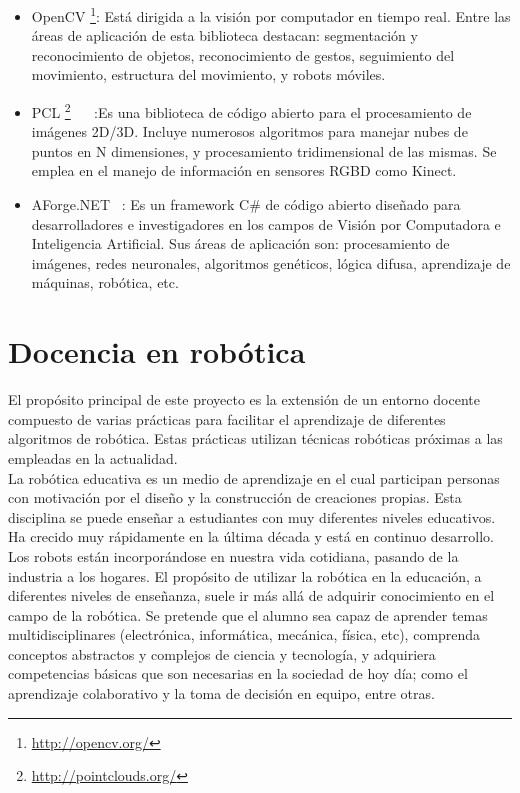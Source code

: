 \begin{itemize}
\item OpenCV \footnote{\url{http://opencv.org/}}: Está dirigida a la visión por computador en tiempo real. Entre las áreas de aplicación de esta biblioteca destacan: segmentación y reconocimiento de objetos, reconocimiento de gestos, seguimiento del movimiento, estructura del movimiento,  y robots móviles.
\item PCL \footnote{\url{http://pointclouds.org/}} ~\cite{pcl} ~\cite{pcl1}:Es una biblioteca de código abierto para el procesamiento de imágenes 2D/3D. Incluye numerosos algoritmos para manejar nubes  de puntos en N dimensiones, y procesamiento tridimensional de las mismas. Se emplea en el manejo de información en sensores RGBD como Kinect.
\item AForge.NET ~\cite{AForge.NET}: Es un framework C\# de código abierto diseñado para desarrolladores e investigadores en los campos de Visión por Computadora e Inteligencia Artificial. Sus áreas de aplicación son: procesamiento de imágenes, redes neuronales, algoritmos genéticos, lógica difusa, aprendizaje de máquinas, robótica, etc.
\end{itemize}

\section{Docencia en robótica}
El propósito principal de este proyecto es la extensión de un entorno docente compuesto de varias prácticas para facilitar el aprendizaje de diferentes algoritmos de robótica. Estas prácticas utilizan técnicas robóticas próximas a las empleadas en la actualidad.\\

La robótica educativa es un medio de aprendizaje en el cual participan personas con motivación por el diseño y la construcción de creaciones propias. Esta disciplina se puede enseñar a estudiantes con muy diferentes niveles educativos. Ha crecido muy rápidamente en la última década y está en continuo desarrollo. Los robots están incorporándose en nuestra vida cotidiana, pasando de la industria a los hogares. El propósito de utilizar la robótica en la educación, a diferentes niveles de enseñanza, suele ir más allá de adquirir conocimiento en el campo de la robótica. Se pretende que el alumno sea capaz de aprender temas multidisciplinares (electrónica, informática, mecánica, física, etc), comprenda conceptos abstractos y complejos de ciencia y tecnología, y adquiriera competencias básicas que son necesarias en la sociedad de hoy día; como el aprendizaje colaborativo y la toma de decisión en equipo, entre otras.\\

